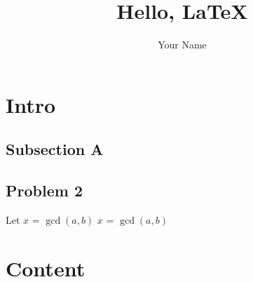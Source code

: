 \documentclass[12pt]{article}
\title{Hello, \LaTeX}
\author{Your Name}
\begin{document}
\maketitle
\section{Intro}
\subsection{Subsection A}
\subsection{Problem 2}

Let $x$ = $\gcd(a,b)$
$x$ = $\gcd(a,b)$


\section{Content} 
\end{document}
